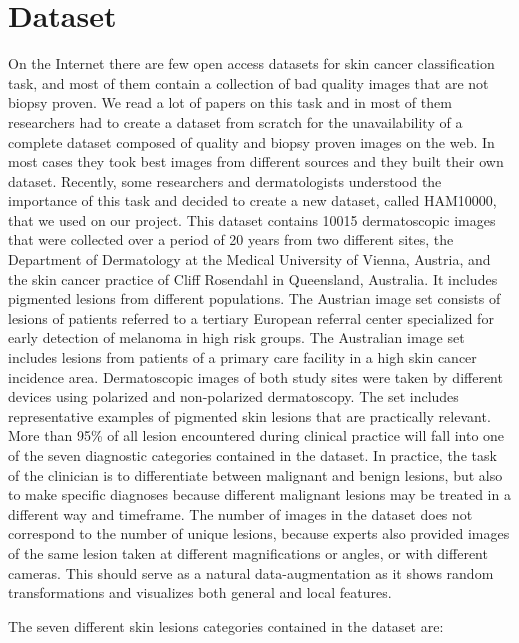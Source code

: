 \section{Dataset} \label{dataset}

	On the Internet there are few open access datasets for skin cancer classification task, and most of them contain a collection of bad quality images that are not biopsy proven. We read a lot of papers on this task and in most of them researchers had to create a dataset from scratch for the unavailability of a complete dataset composed of quality and biopsy proven images on the web. In most cases they took best images from different sources and they built their own dataset. Recently, some researchers and dermatologists understood the importance of this task and decided to create a new dataset, called HAM10000, that we used on our project. 
	This dataset contains 10015 dermatoscopic images that were collected over a period of 20 years from two different sites, the Department of Dermatology at the Medical University of Vienna, Austria, and the skin cancer practice of Cliff Rosendahl in Queensland, Australia. It includes pigmented lesions from different populations. The Austrian image set consists of lesions of patients referred to a tertiary European referral center specialized for early detection of melanoma in high risk groups. The Australian image set includes lesions from patients of a primary care facility in a high skin cancer incidence area. Dermatoscopic images of both study sites were taken by different devices using polarized and non-polarized dermatoscopy. The set includes representative examples of pigmented skin lesions that are practically relevant. More than 95\% of all lesion encountered during clinical practice will fall into one of the seven diagnostic categories contained in the dataset. In practice, the task of the clinician is to differentiate between malignant and benign lesions, but also to make specific diagnoses because different malignant lesions may be treated in a different way and timeframe. The number of images in the dataset does not correspond to the number of unique lesions, because experts also provided images of the same lesion taken at different magnifications or angles, or with different cameras. This should serve as a natural data-augmentation as it shows random transformations and visualizes both general and local features.
	
	\bigskip
	
	The seven different skin lesions categories contained in the dataset are:
	
